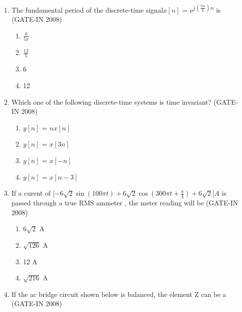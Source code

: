 \documentclass[journal,12pt,onecolumn]{IEEEtran}
\theoremstyle{remark}
\begin{document}
\begin{enumerate}[label=Q.\arabic*,start=1]
    \item  The fundamental period of the discrete-time signal$x[n]$ = e\textsuperscript{$j(\frac{5\pi}{6})n$} is  (GATE-IN 2008)
    \begin{multicols}{4}
    \begin{enumerate} 
        \item $\frac{6}{5\pi}$
        \item $\frac{12}{5}$
        \item 6
        \item 12
    \end{enumerate}
    \end{multicols}
    
    \item  Which one of the following discrete-time systems is time invariant? (GATE-IN 2008)
    \begin{multicols}{4}
    \begin{enumerate} 
        \item $y[n]$ = $nx[n]$
        \item $y[n]$ = $x[3n]$
        \item $y[n]$ = $x[-n]$
        \item $y[n]$ = $x[n-3]$
    \end{enumerate}
    \end{multicols}
    
    \item If a curent of [$-6\sqrt{2}\sin(100{\pi}t) +6\sqrt{2}\cos(300{\pi}t + \frac{\pi}{4}) + 6\sqrt{2}$]$A$ is passed through a true RMS ammeter , the meter reading will be (GATE-IN 2008) 
    \begin{multicols}{4}
    \begin{enumerate} 
        \item $6\sqrt{2}$ A
        \item $\sqrt{126}$ A
        \item 12 A
        \item $\sqrt{216}$ A
    \end{enumerate}
    \end{multicols}
    
    \item If the ac bridge circuit shown below is balanced, the element Z can be a  (GATE-IN 2008)


\end{enumerate}
\end{document}
